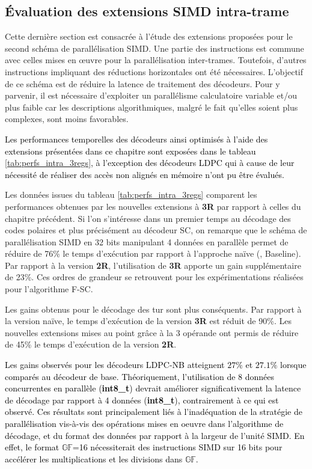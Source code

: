 \documentclass[../main.tex]{subfiles}
\begin{document}
\subsection{Évaluation des extensions SIMD intra-trame}
%
%
%
Cette dernière section est consacrée à l'étude des extensions proposées pour le second schéma de parallélisation SIMD. 
Une partie des instructions est commune avec celles mises en œuvre pour la parallélisation inter-trames. 
Toutefois, d'autres instructions impliquant des réductions horizontales ont été nécessaires. L'objectif de ce schéma est de réduire la latence de traitement des décodeurs. 
Pour y parvenir, il est nécessaire d'exploiter un parallélisme calculatoire variable et/ou plus faible car les descriptions algorithmiques, malgré le fait qu'elles soient plus complexes, sont moins favorables.

\textcolor{black}{Les performances temporelles des décodeurs ainsi optimisés à l'aide des extensions présentées dans ce chapitre sont exposées dans le tableau \ref{tab:perfs_intra_3regs}, à l'exception des décodeurs LDPC qui à cause de leur nécessité de réaliser des accès non alignés en mémoire n'ont pu être évalués.}

Les données issues du tableau \ref{tab:perfs_intra_3regs} comparent les performances obtenues par les nouvelles extensions à \textbf{3R} par rapport à celles du chapitre précédent.
Si l'on s'intéresse dans un premier temps au décodage des codes polaires et plus précisément au décodeur SC, on remarque que le schéma de parallélisation SIMD en 32 bits manipulant 4 données en parallèle permet de réduire de 76\% le temps d'exécution par rapport à l'approche naïve (, Baseline).
Par rapport à la version \textbf{2R}, l'utilisation de \textbf{3R} apporte un gain supplémentaire de 23\%.
Ces ordres de grandeur se retrouvent pour les expérimentations réalisées pour l'algorithme F-SC.

Les gains obtenus pour le décodage des \acrlong{tur} sont plus conséquents. Par rapport à la version naïve, le temps d'exécution de la version \textbf{3R} est réduit de 90\%.
Les nouvelles extensions mises au point grâce à la 3 opérande ont permis de réduire de 45\% le temps d'exécution de la version \textbf{2R}.

\textcolor{black}{Les gains observés pour les décodeurs LDPC-NB atteignent $27\%$ et $27.1\%$ lorsque comparés au décodeur de base. Théoriquement, l'utilisation de 8 données concurrentes en parallèle (\textbf{int8\_t}) devrait améliorer significativement la latence de décodage par rapport à 4 données (\textbf{int8\_t}), contrairement à ce qui est observé.
Ces résultats sont principalement liés à l'inadéquation de la stratégie de parallélisation vis-à-vis des opérations mises en oeuvre dans l'algorithme de décodage, et du format des données par rapport à la largeur de l'unité SIMD.
En effet, le format $\mathbb{GF}$=16 nécessiterait des instructions SIMD sur 16 bits pour accélérer les multiplications et les divisions dans $\mathbb{GF}$.}
\end{document}
